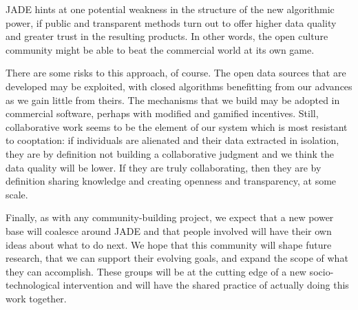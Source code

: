 \documentclass[sigconf, anonymous, review]{acmart}
\begin{document}
JADE hints at one potential weakness in the structure of the new algorithmic power, if public and transparent methods turn out to offer higher data quality and greater trust in the resulting products.  In other words, the open culture community might be able to beat the commercial world at its own game.

There are some risks to this approach, of course.  The open data sources that are developed may be exploited, with closed algorithms benefitting from our advances as we gain little from theirs.  The mechanisms that we build may be adopted in commercial software, perhaps with modified and gamified incentives.  Still, collaborative work seems to be the element of our system which is most resistant to cooptation: if individuals are alienated and their data extracted in isolation, they are by definition not building a collaborative judgment and we think the data quality will be lower.  If they are truly collaborating, then they are by definition sharing knowledge and creating openness and transparency, at some scale.

Finally, as with any community-building project, we expect that a new power base will coalesce around JADE and that people involved will have their own ideas about what to do next.  We hope that this community will shape future research, that we can support their evolving goals, and expand the scope of what they can accomplish.  These groups will be at the cutting edge of a new socio-technological intervention and will have the shared practice of actually doing this work together.

\balance{}



\end{document}
